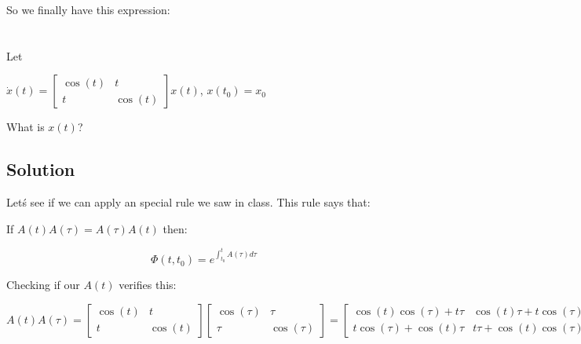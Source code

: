 \documentclass[10pt,a4paper]{article}
\begin{document}
So we finally have this expression:
\begin{center}
\end{center}

\section{}
Let
\begin{center}
$ \dot{x}(t) = 
\begin{bmatrix}
\cos(t) & t \\
t & \cos(t)
\end{bmatrix}
x(t)$, \hspace*{1cm}
$x(t_{0}) = x_{0}$
\end{center}

What is $x(t)$?

\subsection*{Solution}

Let\'s see if we can apply an special rule we saw in class. This rule says that:

If $A(t)A(\tau) = A(\tau)A(t)$ then:

\[ \Phi (t,t_{0}) = e^{ \int_{t_{0}}^{t}A(\tau)d\tau } \]

Checking if our $A(t)$ verifies this:

\[A(t)A(\tau) = 
\begin{bmatrix}
\cos (t) & t \\
t & \cos (t)
\end{bmatrix}
\begin{bmatrix}
\cos (\tau) & \tau \\
\tau & \cos (\tau)
\end{bmatrix}
=
\begin{bmatrix}
\cos (t)\cos (\tau) + t\tau & \cos (t)\tau + t\cos (\tau) \\
t\cos (\tau) + \cos (t)\tau & t\tau + \cos (t)\cos (\tau)
\end{bmatrix}
\]
\end{document}
